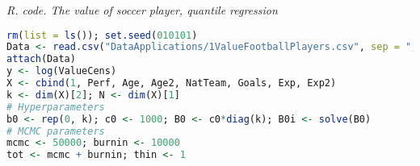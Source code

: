 \begin{tcolorbox}[enhanced,width=4.67in,center upper,
	fontupper=\large\bfseries,drop shadow southwest,sharp corners]
	\textit{R. code. The value of soccer player, quantile regression}
	\begin{VF}
		\begin{lstlisting}[language=R]
rm(list = ls()); set.seed(010101)
Data <- read.csv("DataApplications/1ValueFootballPlayers.csv", sep = ",", header = TRUE, fileEncoding = "latin1")
attach(Data)
y <- log(ValueCens) 
X <- cbind(1, Perf, Age, Age2, NatTeam, Goals, Exp, Exp2)
k <- dim(X)[2]; N <- dim(X)[1]
# Hyperparameters
b0 <- rep(0, k); c0 <- 1000; B0 <- c0*diag(k); B0i <- solve(B0)
# MCMC parameters
mcmc <- 50000; burnin <- 10000
tot <- mcmc + burnin; thin <- 1
\end{lstlisting}
	\end{VF}
\end{tcolorbox} 

